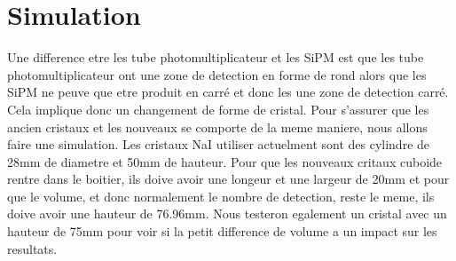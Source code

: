\section{Simulation}
Une difference etre les tube photomultiplicateur et les SiPM est que les tube photomultiplicateur ont une zone de detection en forme de rond alors que les SiPM ne peuve que etre produit en carré et donc les une zone de detection carré. Cela implique donc un changement de forme de cristal. Pour s'assurer que les ancien cristaux et les nouveaux se comporte de la meme maniere, nous allons faire une simulation. Les cristaux NaI utiliser actuelment sont des cylindre de 28mm de diametre et 50mm de hauteur. Pour que les nouveaux critaux cuboide rentre dans le boitier, ils doive avoir une longeur et une largeur de 20mm et pour que le volume, et donc normalement le nombre de detection, reste le meme, ils doive avoir une hauteur de 76.96mm. Nous testeron egalement un cristal avec un hauteur de 75mm pour voir si la petit difference de volume a un impact sur les resultats.
\datatable
